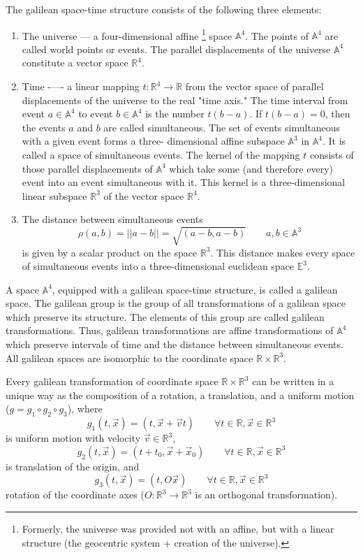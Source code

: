 \documentclass[11pt]{book}
\begin{document}
The galilean space-time structure consists of the following three elements:
\begin{enumerate}
    \item The universe --- a four-dimensional affine \footnote{Formerly, the universe was provided not with an affine, but with a linear structure (the geocentric system + creation of the universe).} space $\mathbb{A}^4$. 
        The points of $\mathbb{A}^4$ are called world points or events. 
        The parallel displacements of the universe $\mathbb{A}^4$
        constitute a vector space $\mathbb{R}^4$.
    \item Time -—- a linear mapping $t: \mathbb{R}^4 \rightarrow \mathbb{R}$ 
        from the vector space of parallel displacements of the 
        universe to the real "time axis." 
        The time interval from event $a \in \mathbb{A}^4$ 
        to event $b \in \mathbb{A}^4$ is the number $t(b - a)$. 
        If $t(b - a) = 0$, then the events $a$ and $b$ are called simultaneous.
The set of events simultaneous with a given event forms a three-
dimensional affine subspace $\mathbb{A}^3$ in $\mathbb{A}^4$. 
        It is called a space of simultaneous events.
The kernel of the mapping $t$ consists of those parallel displacements of
 $\mathbb{A}^4$ which take some (and therefore every) event into an event simultaneous
with it. This kernel is a three-dimensional linear subspace $\mathbb{R}^3$ of the vector
space $\mathbb{R}^4$.
\item The distance between simultaneous events
    \[\rho(a, b) = ||a - b|| =\sqrt{(a - b,a - b)}\qquad a,b \in \mathbb{A}^3 \]
is given by a scalar product on the space $\mathbb{R}^3$. This distance makes every
space of simultaneous events into a three-dimensional euclidean space $\mathbb{E}^3$.
\end{enumerate}

A space $\mathbb{A}^4$, equipped with a galilean space-time structure, is called a
galilean space. The galilean group is the group of all transformations of a galilean space
which preserve its structure. The elements of this group are called galilean
transformations. Thus, galilean transformations are affine transformations
of $\mathbb{A}^4$ which preserve intervals of time and the distance between simultaneous
events. All galilean spaces are isomorphic to the coordinate space $\mathbb{R} \times \mathbb{R}^3$.

Every galilean transformation of  coordinate space $\mathbb{R} \times \mathbb{R}^3$
can be written in a unique way as the composition of a rotation, a translation,
and a uniform motion ($g = g_1 \circ g_2 \circ g_3$), where
\[g_1(t,\vec x)=(t,\vec x+\vec v t)\qquad \forall t\in \mathbb{R},\vec x \in\mathbb{R}^3\] is uniform motion with velocity $\vec v \in\mathbb{R}^3$,
\[g_2(t,\vec x)=(t+t_0,\vec x+\vec x_0)\qquad \forall t\in \mathbb{R},\vec x \in\mathbb{R}^3\] is translation of the origin, and
\[g_3(t,\vec x)=(t,O\vec x)\qquad \forall t\in \mathbb{R},\vec x \in\mathbb{R}^3\] rotation of the coordinate axes ($O:\mathbb{R}^3 \rightarrow \mathbb{R}^3$ is an orthogonal transformation).
\end{document}
